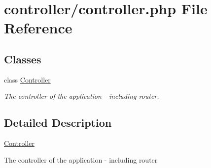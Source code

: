 \hypertarget{controller_8php}{\section{controller/controller.php File Reference}
\label{controller_8php}
}
\subsection*{Classes}
\begin{DoxyCompactItemize}
\item 
class \hyperlink{classController}{Controller}
\begin{DoxyCompactList}\small\item\em The controller of the application -\/ including router. \end{DoxyCompactList}\end{DoxyCompactItemize}


\subsection{Detailed Description}
\hyperlink{classController}{Controller}

The controller of the application -\/ including router 